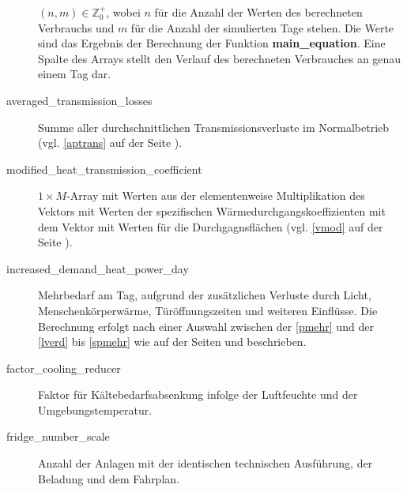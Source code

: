 \begin{description}
	$(n,m)\in \mathbb{Z}^+_0$, wobei $n$ f\"ur die Anzahl der Werten des
	berechneten Verbrauchs und $m$ f\"ur die Anzahl der simulierten Tage
	stehen. Die Werte sind das Ergebnis der
	Berechnung der Funktion \textbf{main\_equation}. Eine Spalte des Arrays
	stellt den Verlauf des berechneten Verbrauches an genau einem Tag dar.
	\item[averaged\_transmission\_losses] Summe aller durchschnittlichen
	Transmissionsverluste im Normalbetrieb (vgl. \cref{aptrans} auf der
	Seite \pageref{aptrans}).
	\item[modified\_heat\_transmission\_coefficient] $1\times M$-Array mit
	Werten aus der elementenweise Multiplikation des Vektors mit Werten der
	spezifischen W\"armedurchgangskoeffizienten mit dem Vektor mit Werten
	f\"ur die Durchgagnsfl\"achen (vgl. \cref{vmod} auf der Seite
	\pageref{vmod}).
	\item[increased\_demand\_heat\_power\_day] Mehrbedarf am Tag, aufgrund
	der zus\"atzlichen Verluste durch Licht, Menschenk\"orperw\"arme,
	T\"ur\"offnungszeiten und weiteren Einfl\"usse. Die Berechnung erfolgt
	nach einer Auswahl zwischen der \cref{pmehr} und der \cref{lverd} bis
	\cref{spmehr} wie auf der Seiten \pageref{pmehr} und \pageref{spmehr}
	beschrieben.
	\item[factor\_cooling\_reducer] Faktor f\"ur K\"altebedarfsabsenkung
	infolge der Luftfeuchte und der Umgebungstemperatur.
	\item[fridge\_number\_scale] Anzahl der Anlagen mit der identischen
	technischen Ausf\"uhrung, der Beladung und dem Fahrplan.
\end{description}

